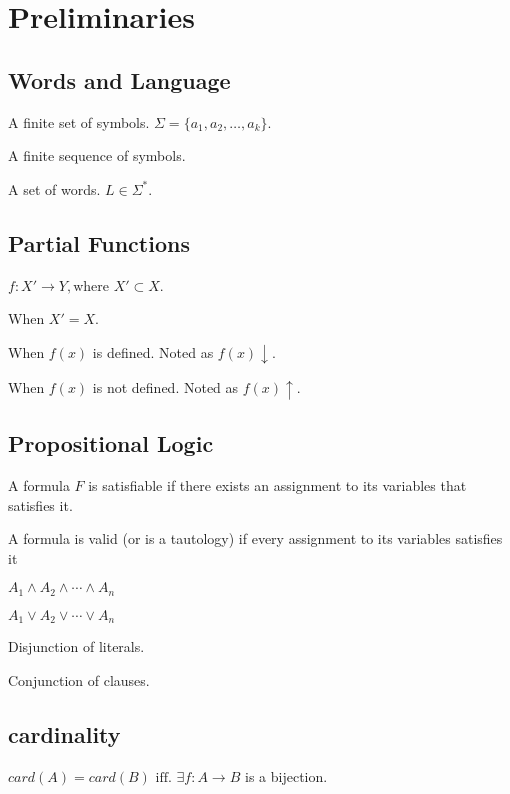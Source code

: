 \section{Preliminaries}

\subsection{Words and Language}

 A finite set of symbols. $\Sigma=\{a_1, a_2,\ldots,a_k\}$.

 A finite sequence of symbols.

 A set of words. $L \in \Sigma^*$.

\subsection{Partial Functions}

 $f: X' \rightarrow Y, \text{where } X' \subset X$.

 When $X' = X$.

 When $f(x)$ is defined. Noted as $f(x) \downarrow$.

 When $f(x)$ is not defined. Noted as $f(x) \uparrow$.

\subsection{Propositional Logic}

  A formula $F$ is
satisfiable if there exists an assignment to its variables that satisfies it.

 A formula is valid (or is a tautology) if every assignment to
its
variables satisfies it

 $A_1 \land A_2 \land \cdots \land A_n$

 $A_1 \lor A_2 \lor \cdots \lor A_n$

 Disjunction of literals.

 Conjunction of clauses.

\subsection{cardinality}

 $card(A) = card(B) \text{ iff. } \exists f: A \rightarrow
B$ is a bijection.

